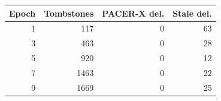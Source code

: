 \begin{tabular}{rrrr}
\toprule
Epoch & Tombstones & PACER-X del. & Stale del.\\
\midrule
1 & 117 & 0 & 63\\
3 & 463 & 0 & 28\\
5 & 920 & 0 & 12\\
7 & 1463 & 0 & 22\\
9 & 1669 & 0 & 25\\
\bottomrule
\end{tabular}
